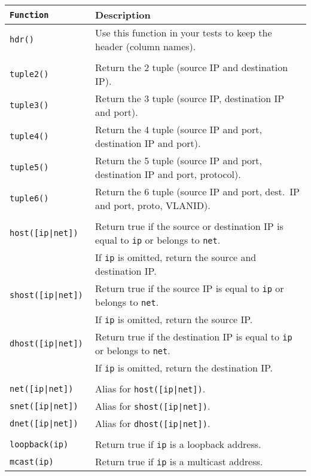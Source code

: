 \documentclass[documentation]{subfiles}
\begin{document}
\begin{longtable}{>{\tt}ll}
    \toprule
    {\bf Function} & {\bf Description}\\
    \midrule\endhead%
    hdr()                       & Use this function in your tests to keep the header (column names).\\
    \\
    tuple2()                    & Return the 2 tuple (source IP and destination IP).\\
    tuple3()                    & Return the 3 tuple (source IP, destination IP and port).\\
    tuple4()                    & Return the 4 tuple (source IP and port, destination IP and port).\\
    tuple5()                    & Return the 5 tuple (source IP and port, destination IP and port, protocol).\\
    tuple6()                    & Return the 6 tuple (source IP and port, dest.\ IP and port, proto, VLANID).\\
    \\
    host([ip|net])              & Return true if the source or destination IP is equal to {\tt ip} or belongs to {\tt net}.\\
                                & If {\tt ip} is omitted, return the source and destination IP.\\
    shost([ip|net])             & Return true if the source IP is equal to {\tt ip} or belongs to {\tt net}.\\
                                & If {\tt ip} is omitted, return the source IP.\\
    dhost([ip|net])             & Return true if the destination IP is equal to {\tt ip} or belongs to {\tt net}.\\
                                & If {\tt ip} is omitted, return the destination IP.\\
    \\
    net([ip|net])               & Alias for {\tt host([ip|net])}.\\
    snet([ip|net])              & Alias for {\tt shost([ip|net])}.\\
    dnet([ip|net])              & Alias for {\tt dhost([ip|net])}.\\
    \\
    loopback(ip)                & Return true if {\tt ip} is a loopback address.\\
    mcast(ip)                   & Return true if {\tt ip} is a multicast address.\\

\end{longtable}
\end{document}
